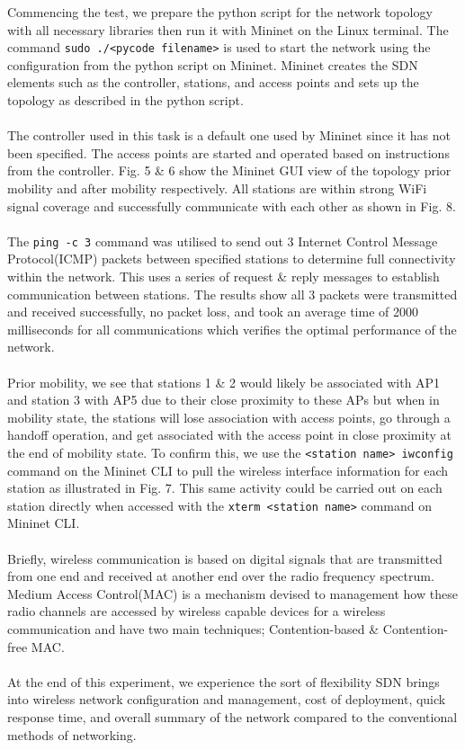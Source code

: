 \documentclass{article}
\begin{document}
Commencing the test, we prepare the python script for the network topology with all necessary libraries then run it with Mininet on the Linux terminal. The command \texttt{sudo ./<pycode filename>} is used to start the network using the configuration from the python script on Mininet. Mininet creates the SDN elements such as the controller, stations, and access points and sets up the topology as described in the python script. \\\\ The controller used in this task is a default one used by Mininet since it has not been specified. The access points are started and operated based on instructions from the controller. Fig. 5 \& 6 show the Mininet GUI view of the topology prior mobility and after mobility respectively. All stations are within strong WiFi signal coverage and successfully communicate with each other as shown in Fig. 8. \\\\ The \texttt{ping -c 3} command was utilised to send out 3 Internet Control Message Protocol(ICMP)\cite{1010101} packets between specified stations to determine full connectivity within the network. This uses a series of request \& reply messages to establish communication between stations. The results show all 3 packets were transmitted and received successfully, no packet loss, and took an average time of 2000 milliseconds for all communications which verifies the optimal performance of the network. \\\\ Prior mobility, we see that stations 1 \& 2 would likely be associated with AP1 and station 3 with AP5 due to their close proximity to these APs but when in mobility state, the stations will lose association with access points, go through a handoff operation, and get associated with the access point in close proximity at the end of mobility state. To confirm this, we use the \texttt{<station name> iwconfig} command on the Mininet CLI to pull the wireless interface information for each station as illustrated in Fig. 7. This same activity could be carried out on each station directly when accessed with the \texttt{xterm <station name>} command on Mininet CLI. \\\\ Briefly, wireless communication is based on digital signals that are transmitted from one end and received at another end over the radio frequency spectrum. Medium Access Control(MAC)\cite{1010101} is a mechanism devised to management how these radio channels are accessed by wireless capable devices for a wireless communication and have two main techniques; Contention-based \& Contention-free MAC. \\\\ At the end of this experiment, we experience the sort of flexibility SDN brings into wireless network configuration and management, cost of deployment,  quick response time, and overall summary of the network compared to the conventional methods of networking.
\end{document}
